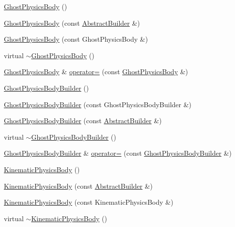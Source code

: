\begin{DoxyCompactItemize}
\item 
\hyperlink{namespacejli_a7caf1415906897121ee3e6de60a329c8}{Ghost\+Physics\+Body} ()
\item 
\hyperlink{namespacejli_afb5a03f7022ad75046c07614859007b4}{Ghost\+Physics\+Body} (const \hyperlink{classjli_1_1_abstract_builder}{Abstract\+Builder} \&)
\item 
\hyperlink{namespacejli_ad74fccf745d72bb59ea02ffcf00325ba}{Ghost\+Physics\+Body} (const Ghost\+Physics\+Body \&)
\item 
virtual \hyperlink{namespacejli_abfb169533b2b5c29c2006d9db4a7f886}{$\sim$\+Ghost\+Physics\+Body} ()
\item 
\hyperlink{namespacejli_a7caf1415906897121ee3e6de60a329c8}{Ghost\+Physics\+Body} \& \hyperlink{namespacejli_ad382a206eb3ee58d6d77638319d16a92}{operator=} (const \hyperlink{namespacejli_a7caf1415906897121ee3e6de60a329c8}{Ghost\+Physics\+Body} \&)
\item 
\hyperlink{namespacejli_a3aff4e56b78db8f38ca21c4215ef5c05}{Ghost\+Physics\+Body\+Builder} ()
\item 
\hyperlink{namespacejli_ac715c051dda98c145182dfd6797b21d4}{Ghost\+Physics\+Body\+Builder} (const Ghost\+Physics\+Body\+Builder \&)
\item 
\hyperlink{namespacejli_a87d58ccea384f9c099a54185ac2b10e1}{Ghost\+Physics\+Body\+Builder} (const \hyperlink{classjli_1_1_abstract_builder}{Abstract\+Builder} \&)
\item 
virtual \hyperlink{namespacejli_a7dd6a4d9cc536d96cbb275a6bdc103c7}{$\sim$\+Ghost\+Physics\+Body\+Builder} ()
\item 
\hyperlink{namespacejli_a3aff4e56b78db8f38ca21c4215ef5c05}{Ghost\+Physics\+Body\+Builder} \& \hyperlink{namespacejli_a00a7b4875cc46a0309f9372b44b119b1}{operator=} (const \hyperlink{namespacejli_a3aff4e56b78db8f38ca21c4215ef5c05}{Ghost\+Physics\+Body\+Builder} \&)
\item 
\hyperlink{namespacejli_a7a3913d5239a7a26f7b249c8352cfb7e}{Kinematic\+Physics\+Body} ()
\item 
\hyperlink{namespacejli_ad12a03a0d7f868a1a84fe43d58c4c168}{Kinematic\+Physics\+Body} (const \hyperlink{classjli_1_1_abstract_builder}{Abstract\+Builder} \&)
\item 
\hyperlink{namespacejli_a5ddb3c57d768905fbeb013afc3e17197}{Kinematic\+Physics\+Body} (const Kinematic\+Physics\+Body \&)
\item 
virtual \hyperlink{namespacejli_afe5fa54bbd9c734f8154e094f50b8344}{$\sim$\+Kinematic\+Physics\+Body} ()
\item 

\end{DoxyCompactItemize}
